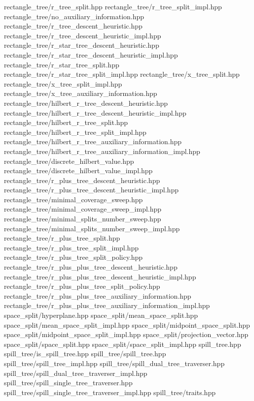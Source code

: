 rectangle\+\_\+tree/r\+\_\+tree\+\_\+split.\+hpp rectangle\+\_\+tree/r\+\_\+tree\+\_\+split\+\_\+impl.\+hpp rectangle\+\_\+tree/no\+\_\+auxiliary\+\_\+information.\+hpp rectangle\+\_\+tree/r\+\_\+tree\+\_\+descent\+\_\+heuristic.\+hpp rectangle\+\_\+tree/r\+\_\+tree\+\_\+descent\+\_\+heuristic\+\_\+impl.\+hpp rectangle\+\_\+tree/r\+\_\+star\+\_\+tree\+\_\+descent\+\_\+heuristic.\+hpp rectangle\+\_\+tree/r\+\_\+star\+\_\+tree\+\_\+descent\+\_\+heuristic\+\_\+impl.\+hpp rectangle\+\_\+tree/r\+\_\+star\+\_\+tree\+\_\+split.\+hpp rectangle\+\_\+tree/r\+\_\+star\+\_\+tree\+\_\+split\+\_\+impl.\+hpp rectangle\+\_\+tree/x\+\_\+tree\+\_\+split.\+hpp rectangle\+\_\+tree/x\+\_\+tree\+\_\+split\+\_\+impl.\+hpp rectangle\+\_\+tree/x\+\_\+tree\+\_\+auxiliary\+\_\+information.\+hpp rectangle\+\_\+tree/hilbert\+\_\+r\+\_\+tree\+\_\+descent\+\_\+heuristic.\+hpp rectangle\+\_\+tree/hilbert\+\_\+r\+\_\+tree\+\_\+descent\+\_\+heuristic\+\_\+impl.\+hpp rectangle\+\_\+tree/hilbert\+\_\+r\+\_\+tree\+\_\+split.\+hpp rectangle\+\_\+tree/hilbert\+\_\+r\+\_\+tree\+\_\+split\+\_\+impl.\+hpp rectangle\+\_\+tree/hilbert\+\_\+r\+\_\+tree\+\_\+auxiliary\+\_\+information.\+hpp rectangle\+\_\+tree/hilbert\+\_\+r\+\_\+tree\+\_\+auxiliary\+\_\+information\+\_\+impl.\+hpp rectangle\+\_\+tree/discrete\+\_\+hilbert\+\_\+value.\+hpp rectangle\+\_\+tree/discrete\+\_\+hilbert\+\_\+value\+\_\+impl.\+hpp rectangle\+\_\+tree/r\+\_\+plus\+\_\+tree\+\_\+descent\+\_\+heuristic.\+hpp rectangle\+\_\+tree/r\+\_\+plus\+\_\+tree\+\_\+descent\+\_\+heuristic\+\_\+impl.\+hpp rectangle\+\_\+tree/minimal\+\_\+coverage\+\_\+sweep.\+hpp rectangle\+\_\+tree/minimal\+\_\+coverage\+\_\+sweep\+\_\+impl.\+hpp rectangle\+\_\+tree/minimal\+\_\+splits\+\_\+number\+\_\+sweep.\+hpp rectangle\+\_\+tree/minimal\+\_\+splits\+\_\+number\+\_\+sweep\+\_\+impl.\+hpp rectangle\+\_\+tree/r\+\_\+plus\+\_\+tree\+\_\+split.\+hpp rectangle\+\_\+tree/r\+\_\+plus\+\_\+tree\+\_\+split\+\_\+impl.\+hpp rectangle\+\_\+tree/r\+\_\+plus\+\_\+tree\+\_\+split\+\_\+policy.\+hpp rectangle\+\_\+tree/r\+\_\+plus\+\_\+plus\+\_\+tree\+\_\+descent\+\_\+heuristic.\+hpp rectangle\+\_\+tree/r\+\_\+plus\+\_\+plus\+\_\+tree\+\_\+descent\+\_\+heuristic\+\_\+impl.\+hpp rectangle\+\_\+tree/r\+\_\+plus\+\_\+plus\+\_\+tree\+\_\+split\+\_\+policy.\+hpp rectangle\+\_\+tree/r\+\_\+plus\+\_\+plus\+\_\+tree\+\_\+auxiliary\+\_\+information.\+hpp rectangle\+\_\+tree/r\+\_\+plus\+\_\+plus\+\_\+tree\+\_\+auxiliary\+\_\+information\+\_\+impl.\+hpp space\+\_\+split/hyperplane.\+hpp space\+\_\+split/mean\+\_\+space\+\_\+split.\+hpp space\+\_\+split/mean\+\_\+space\+\_\+split\+\_\+impl.\+hpp space\+\_\+split/midpoint\+\_\+space\+\_\+split.\+hpp space\+\_\+split/midpoint\+\_\+space\+\_\+split\+\_\+impl.\+hpp space\+\_\+split/projection\+\_\+vector.\+hpp space\+\_\+split/space\+\_\+split.\+hpp space\+\_\+split/space\+\_\+split\+\_\+impl.\+hpp spill\+\_\+tree.\+hpp spill\+\_\+tree/is\+\_\+spill\+\_\+tree.\+hpp spill\+\_\+tree/spill\+\_\+tree.\+hpp spill\+\_\+tree/spill\+\_\+tree\+\_\+impl.\+hpp spill\+\_\+tree/spill\+\_\+dual\+\_\+tree\+\_\+traverser.\+hpp spill\+\_\+tree/spill\+\_\+dual\+\_\+tree\+\_\+traverser\+\_\+impl.\+hpp spill\+\_\+tree/spill\+\_\+single\+\_\+tree\+\_\+traverser.\+hpp spill\+\_\+tree/spill\+\_\+single\+\_\+tree\+\_\+traverser\+\_\+impl.\+hpp spill\+\_\+tree/traits.\+hpp 